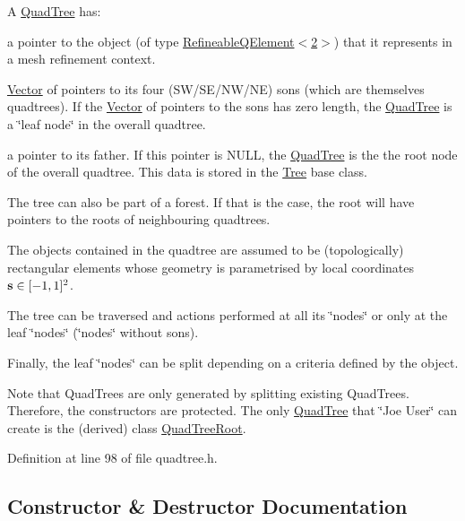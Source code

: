 A \hyperlink{classoomph_1_1QuadTree}{Quad\+Tree} has\+:
\begin{DoxyItemize}
\item a pointer to the object (of type \hyperlink{classoomph_1_1RefineableQElement_3_012_01_4}{Refineable\+Q\+Element$<$2$>$}) that it represents in a mesh refinement context.
\item \hyperlink{classoomph_1_1Vector}{Vector} of pointers to its four (S\+W/\+S\+E/\+N\+W/\+NE) sons (which are themselves quadtrees). If the \hyperlink{classoomph_1_1Vector}{Vector} of pointers to the sons has zero length, the \hyperlink{classoomph_1_1QuadTree}{Quad\+Tree} is a \char`\"{}leaf node\char`\"{} in the overall quadtree.
\item a pointer to its father. If this pointer is N\+U\+LL, the \hyperlink{classoomph_1_1QuadTree}{Quad\+Tree} is the the root node of the overall quadtree. This data is stored in the \hyperlink{classoomph_1_1Tree}{Tree} base class.
\end{DoxyItemize}

The tree can also be part of a forest. If that is the case, the root will have pointers to the roots of neighbouring quadtrees.

The objects contained in the quadtree are assumed to be (topologically) rectangular elements whose geometry is parametrised by local coordinates $ {\bf s} \in [-1,1]^2 $.

The tree can be traversed and actions performed at all its \char`\"{}nodes\char`\"{} or only at the leaf \char`\"{}nodes\char`\"{} (\char`\"{}nodes\char`\"{} without sons).

Finally, the leaf \char`\"{}nodes\char`\"{} can be split depending on a criteria defined by the object.

Note that Quad\+Trees are only generated by splitting existing Quad\+Trees. Therefore, the constructors are protected. The only \hyperlink{classoomph_1_1QuadTree}{Quad\+Tree} that \char`\"{}\+Joe User\char`\"{} can create is the (derived) class \hyperlink{classoomph_1_1QuadTreeRoot}{Quad\+Tree\+Root}. 

Definition at line 98 of file quadtree.\+h.



\subsection{Constructor \& Destructor Documentation}
\mbox{\label{classoomph_1_1QuadTree_ab6dd217086350735063424dc6f7a02fb}} 
